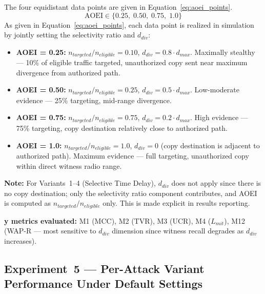\documentclass[12pt, a4paper]{report}
\begin{document}
{{The four equidistant data points are given in
Equation~\eqref{eq:aoei_points}.
\begin{equation}
\text{AOEI} \in
\{0.25,\; 0.50,\; 0.75,\; 1.0\}
\label{eq:aoei_points}
\end{equation}
As given in Equation~\eqref{eq:aoei_points}, each
data point is realized in simulation by jointly
setting the selectivity ratio and $d_{div}$:
\begin{itemize}
    \item \textbf{AOEI = 0.25:}
    $n_{targeted}/n_{eligible} = 0.10$,
    $d_{div} = 0.8 \cdot d_{max}$.
    Maximally stealthy — 10\% of eligible
    traffic targeted, unauthorized copy sent
    near maximum divergence from authorized path.

    \item \textbf{AOEI = 0.50:}
    $n_{targeted}/n_{eligible} = 0.25$,
    $d_{div} = 0.5 \cdot d_{max}$.
    Low-moderate evidence — 25\% targeting,
    mid-range divergence.

    \item \textbf{AOEI = 0.75:}
    $n_{targeted}/n_{eligible} = 0.75$,
    $d_{div} = 0.2 \cdot d_{max}$.
    High evidence — 75\% targeting, copy
    destination relatively close to authorized path.

    \item \textbf{AOEI = 1.0:}
    $n_{targeted}/n_{eligible} = 1.0$,
    $d_{div} = 0$ (copy destination is adjacent
    to authorized path).
    Maximum evidence — full targeting, unauthorized
    copy within direct witness radio range.
\end{itemize}

\textbf{Note:} For Variants~1--4 (Selective Time
Delay), $d_{div}$ does not apply since there is
no copy destination; only the selectivity ratio
component contributes, and AOEI is computed as
$n_{targeted}/n_{eligible}$ only. This is made
explicit in results reporting.

\textbf{y metrics evaluated:}
M1 (MCC), M2 (TVR), M3 (UCR), M4 ($L_{mit}$),
M12 (WAP-R — most sensitive to $d_{div}$ dimension
since witness recall degrades as $d_{div}$ increases).



\subsection{Experiment~5 — Per-Attack Variant
Performance Under Default Settings}
\label{sec:exp5}

}}
\end{document}
